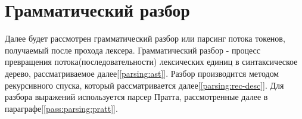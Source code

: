 












\clearpage
\section{Грамматический разбор}
\label{pass:parsing}

Далее будет рассмотрен грамматический разбор или парсинг потока токенов, получаемый после прохода лексера.
Грамматический разбор - процесс превращения потока(последовательности) лексических единиц в синтаксическое дерево, рассматриваемое далее[\ref{parsing:ast}].
Разбор производится методом рекурсивного спуска, который рассматривается далее[\ref{parsing:rec-desc}]. Для разбора выражений используется парсер Пратта, рассмотренные далее в параграфе[\ref{pass:parsing:pratt}].


